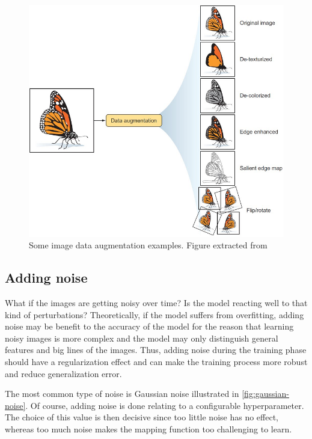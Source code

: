 \documentclass[11pt, openany]{report}
\theoremstyle{plain}
\theoremstyle{definition}
\theoremstyle{remark}
\begin{document}
\begin{figure}[H]
  \centering
  \includegraphics[scale=0.55]{figures/data_augmentation.png}
  \caption{Some image data augmentation examples. Figure extracted from \cite{data-aug-examples}}
  \label{fig:dropout}
\end{figure}


\subsection{Adding noise}
What if the images are getting noisy over time? Is the model reacting well to that kind of perturbations? Theoretically, if the model suffers from overfitting, adding noise may be benefit to the accuracy of the model for the reason that learning noisy images is more complex and the model may only distinguish general features and big lines of the images.
Thus, adding noise during the training phase should have a regularization effect and can make the training process more robust and reduce generalization error. 

The most common type of noise is Gaussian noise illustrated in \autoref{fig:gaussian-noise}. Of course, adding noise is done relating to a configurable hyperparameter. The choice of this value is then decisive since too little noise has no effect, whereas too much noise makes the mapping function too challenging to learn. 
\end{document}
